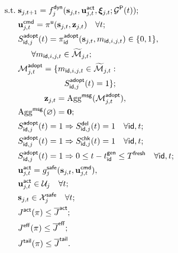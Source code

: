 \documentclass[10pt,a4paper,twocolumn]{article}
\begin{document}
\begin{subequations}
\begin{align}
\mathrm{s.t.}\;&\mathbf s_{j,t+1}=f_j^{\mathsf{dyn}}(\mathbf s_{j,t},\mathbf u_{j,t}^{\mathsf{act}},\boldsymbol\xi_{j,t};
\mathcal G^{\mathsf P}(t));
\label{eq:P2-a}\\
&\mathbf u_{j,t}^{\mathsf{cmd}}=\pi^{\mathsf u}(\mathbf s_{j,t},\mathbf z_{j,t})
\quad\forall t;
\label{eq:P2-b}\\
&\begin{aligned}
S_{\mathsf{id},j}^{\mathsf{adopt}}(t)&=\pi_{\mathsf{id}}^{\mathsf{adopt}}(\mathbf s_{j,t},m_{\mathsf{id},i,j,t})\in\{0,1\},\\
&\hspace{-2em}\forall m_{\mathsf{id},i,j,t}\in\widetilde{\mathcal M}_{j,t};
\end{aligned}
\label{eq:P2-c}\\
&\begin{aligned}
\mathcal M_{j,t}^{\mathsf{adopt}}=\{m_{\mathsf{id},i,j,t}\in\widetilde{\mathcal M}_{j,t}:\\
S_{\mathsf{id},j}^{\mathsf{adopt}}(t)=1\};
\end{aligned}
\label{eq:P2-d}\\
&\begin{aligned}
\mathbf z_{j,t}&=\operatorname{Agg}^{\mathsf{msg}}(\mathcal M_{j,t}^{\mathsf{adopt}}),\\
\operatorname{Agg}^{\mathsf{msg}}(\varnothing)&=\mathbf 0;
\end{aligned}
\label{eq:P2-e}\\
&S_{\mathsf{id},j}^{\mathsf{adopt}}(t)=1\Rightarrow S_{\mathsf{id},j}^{\mathsf{del}}(t)=1\quad\forall \mathsf{id},t;
\label{eq:P2-f}\\
&S_{\mathsf{id},j}^{\mathsf{adopt}}(t)=1\Rightarrow S_{\mathsf{id},j}^{\mathsf{chk}}(t)=1\quad\forall \mathsf{id},t;
\label{eq:P2-g}\\
&S_{\mathsf{id},j}^{\mathsf{adopt}}(t)=1\Rightarrow
0\leq t-t_{\mathsf{id}}^{\mathsf{gen}}\leq T^{\mathsf{fresh}}\quad\forall \mathsf{id},t;
\label{eq:P2-h}\\
&\begin{aligned}
\mathbf u_{j,t}^{\mathsf{act}}&=g_j^{\mathsf{safe}}(\mathbf s_{j,t},\mathbf u_{j,t}^{\mathsf{cmd}}),\\
\mathbf u_{j,t}^{\mathsf{act}}&\in\mathcal U_j\quad\forall t;
\end{aligned}
\label{eq:P2-i}\\
&\mathbf s_{j,t}\in\mathcal X_j^{\mathsf{safe}}\quad\forall t;
\label{eq:P2-j}\\
&J^{\mathsf{act}}(\pi)\leq\overline J^{\mathsf{act}};
\label{eq:P2-k}
\\
&J^{\mathsf{eff}}(\pi)\leq\overline J^{\mathsf{eff}};
\label{eq:P2-l}\\
&J^{\mathsf{tail}}(\pi)\leq\overline J^{\mathsf{tail}}.
\label{eq:P2-m}
\end{align}
\end{subequations}
\end{document}
